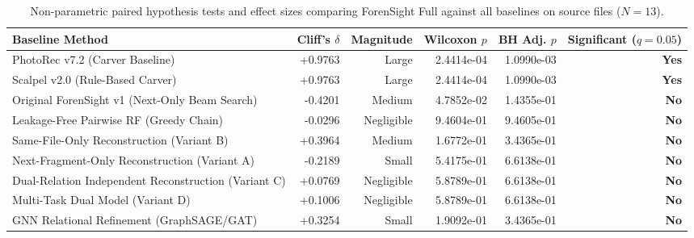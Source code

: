 \begin{table}[t]
\centering
\caption{Non-parametric paired hypothesis tests and effect sizes comparing ForenSight Full against all baselines on source files ($N=13$).}
\label{tab:statistical_significance}
\begin{tabular}{lrrrrr}
\toprule
\textbf{Baseline Method} & \textbf{Cliff's $\delta$} & \textbf{Magnitude} & \textbf{Wilcoxon $p$} & \textbf{BH Adj. $p$} & \textbf{Significant ($q=0.05$)} \\
\midrule
PhotoRec v7.2 (Carver Baseline) & +0.9763 & Large & 2.4414e-04 & 1.0990e-03 & \textbf{Yes} \\
Scalpel v2.0 (Rule-Based Carver) & +0.9763 & Large & 2.4414e-04 & 1.0990e-03 & \textbf{Yes} \\
Original ForenSight v1 (Next-Only Beam Search) & -0.4201 & Medium & 4.7852e-02 & 1.4355e-01 & \textbf{No} \\
Leakage-Free Pairwise RF (Greedy Chain) & -0.0296 & Negligible & 9.4604e-01 & 9.4605e-01 & \textbf{No} \\
Same-File-Only Reconstruction (Variant B) & +0.3964 & Medium & 1.6772e-01 & 3.4365e-01 & \textbf{No} \\
Next-Fragment-Only Reconstruction (Variant A) & -0.2189 & Small & 5.4175e-01 & 6.6138e-01 & \textbf{No} \\
Dual-Relation Independent Reconstruction (Variant C) & +0.0769 & Negligible & 5.8789e-01 & 6.6138e-01 & \textbf{No} \\
Multi-Task Dual Model (Variant D) & +0.1006 & Negligible & 5.8789e-01 & 6.6138e-01 & \textbf{No} \\
GNN Relational Refinement (GraphSAGE/GAT) & +0.3254 & Small & 1.9092e-01 & 3.4365e-01 & \textbf{No} \\
\bottomrule
\end{tabular}
\end{table}
